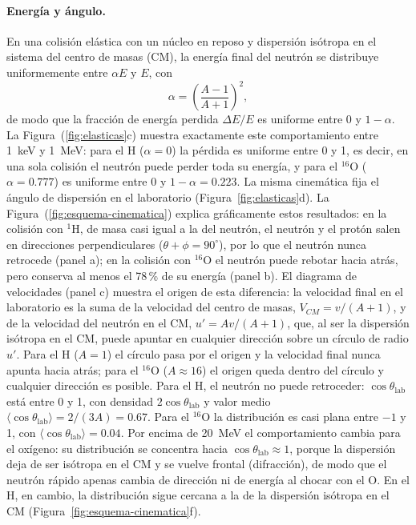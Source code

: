\paragraph{Energía y ángulo.} En una colisión elástica con un núcleo en reposo y dispersión isótropa en el sistema del centro de masas (CM), la energía final del neutrón se distribuye uniformemente entre $\alpha E$ y $E$, con
\begin{equation}
	\alpha=\left(\frac{A-1}{A+1}\right)^{2},
\end{equation}
de modo que la fracción de energía perdida $\Delta E/E$ es uniforme entre 0 y $1-\alpha$. La Figura~(\ref{fig:elasticas}c) muestra exactamente este comportamiento entre 1~keV y 1~MeV: para el H ($\alpha=0$) la pérdida es uniforme entre 0 y 1, es decir, en una sola colisión el neutrón puede perder toda su energía, y para el $^{16}$O ($\alpha=0.777$) es uniforme entre 0 y $1-\alpha=0.223$. La misma cinemática fija el ángulo de dispersión en el laboratorio (Figura~\ref{fig:elasticas}d). La Figura~(\ref{fig:esquema-cinematica}) explica gráficamente estos resultados: en la colisión con $^{1}$H, de masa casi igual a la del neutrón, el neutrón y el protón salen en direcciones perpendiculares ($\theta+\phi=90^{\circ}$), por lo que el neutrón nunca retrocede (panel a); en la colisión con $^{16}$O el neutrón puede rebotar hacia atrás, pero conserva al menos el 78\,\% de su energía (panel b). El diagrama de velocidades (panel c) muestra el origen de esta diferencia: la velocidad final en el laboratorio es la suma de la velocidad del centro de masas, $V_{CM}=v/(A+1)$, y de la velocidad del neutrón en el CM, $u'=Av/(A+1)$, que, al ser la dispersión isótropa en el CM, puede apuntar en cualquier dirección sobre un círculo de radio $u'$. Para el H ($A=1$) el círculo pasa por el origen y la velocidad final nunca apunta hacia atrás; para el $^{16}$O ($A\approx16$) el origen queda dentro del círculo y cualquier dirección es posible. Para el H, el neutrón no puede retroceder: $\cos\theta_{\mathrm{lab}}$ está entre 0 y 1, con densidad $2\cos\theta_{\mathrm{lab}}$ y valor medio $\langle\cos\theta_{\mathrm{lab}}\rangle=2/(3A)=0.67$. Para el $^{16}$O la distribución es casi plana entre $-1$ y 1, con $\langle\cos\theta_{\mathrm{lab}}\rangle=0.04$. Por encima de 20~MeV el comportamiento cambia para el oxígeno: su distribución se concentra hacia $\cos\theta_{\mathrm{lab}}\approx1$, porque la dispersión deja de ser isótropa en el CM y se vuelve frontal (difracción), de modo que el neutrón rápido apenas cambia de dirección ni de energía al chocar con el O. En el H, en cambio, la distribución sigue cercana a la de la dispersión isótropa en el CM (Figura~\ref{fig:esquema-cinematica}f).

